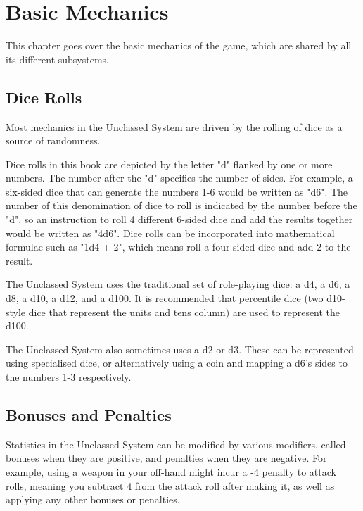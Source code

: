 \chapter{Basic Mechanics}\label{basics}
\begin{multicols*}{2}
    This chapter goes over the basic mechanics of the game, which are shared by all
    its different subsystems.
    
    \section{Dice Rolls}\label{dice}
    Most mechanics in the Unclassed System are driven by the rolling of dice as a
    source of randomness.
    
    Dice rolls in this book are depicted by the letter "d" flanked by one or more
    numbers. The number after the "d" specifies the number of sides. For example, a
    six-sided dice that can generate the numbers 1-6 would be written as "d6". The
    number of this denomination of dice to roll is indicated by the number before
    the "d", so an instruction to roll 4 different 6-sided dice and add the results
    together would be written as "4d6". Dice rolls can be incorporated into
    mathematical formulae such as "1d4 + 2", which means roll a four-sided dice and
    add 2 to the result.
    
    The Unclassed System uses the traditional set of role-playing dice: a d4, a d6,
    a d8, a d10, a d12, and a d100. It is recommended that percentile dice (two
    d10-style dice that represent the units and tens column) are used to represent
    the d100.
    
    The Unclassed System also sometimes uses a d2 or d3. These can be represented
    using specialised dice, or alternatively using a coin and mapping a d6's sides
    to the numbers 1-3 respectively.

    \section{Bonuses and Penalties}\label{bonus}\label{penalty}\label{modifier}
    Statistics in the Unclassed System can be modified by various modifiers, called
    bonuses when they are positive, and penalties when they are negative. For
    example, using a weapon in your off-hand might incur a -4 penalty to attack
    rolls, meaning you subtract 4 from the attack roll after making it, as well
    as applying any other bonuses or penalties.
    

\end{multicols*}
